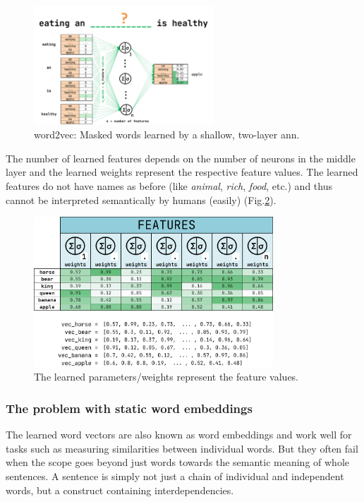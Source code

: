 \begin{figure}[H]
	\centering
	\includegraphics[width=0.6\textwidth]{Assets/featureslearned}
	\caption{word2vec: Masked words learned by a shallow, two-layer \gls{ann}.}
	\label{fig:featureslearned}
\end{figure}

The number of learned features depends on the number of neurons in the middle layer and the learned weights represent the respective feature values.
The learned features do not have names as before (like \emph{animal}, \emph{rich}, \emph{food}, etc.) and thus cannot be interpreted semantically by humans (easily) (Fig.\ref{fig:featvalueslearned}).

\begin{figure}[H]
	\centering
	\includegraphics[width=0.8\textwidth]{Assets/featvalueslearned}
	\caption{The learned parameters/weights represent the feature values.}
	\label{fig:featvalueslearned}
\end{figure}

\subsubsection{The problem with static word embeddings}
The learned word vectors are also known as word embeddings and work well for tasks such as measuring similarities between individual words.
But they often fail when the scope goes beyond just words towards the semantic meaning of whole sentences.
A sentence is simply not just a chain of individual and independent words, but a construct containing interdependencies.

